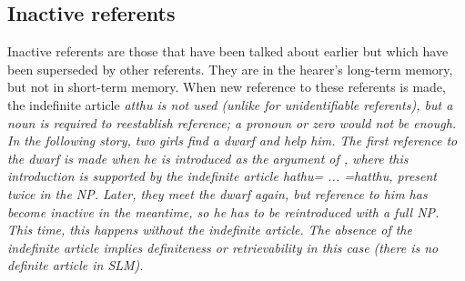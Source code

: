 \subsection{Inactive referents}\label{sec:disc:Unretrievablereferents}
Inactive referents are those that have been talked about earlier but which have been superseded by other referents. They are in the hearer's long-term memory, but not in short-term memory. When new reference to these referents is made, the indefinite article \em atthu \em is not used (unlike for unidentifiable referents), but a noun is required to reestablish reference; a pronoun or zero would not be enough. In the following story, two girls find a dwarf and help him. The first reference to the dwarf is made when he is introduced as the argument of , where this introduction is supported by the indefinite article \em hathu= ... =hatthu\em, present twice in the NP.  Later, they meet the dwarf again, but reference to him has become inactive in the meantime, so he has to be reintroduced with a full NP. This time, this happens without  the indefinite article. The absence of the indefinite article implies definiteness or retrievability in this case (there is no definite article in SLM).


